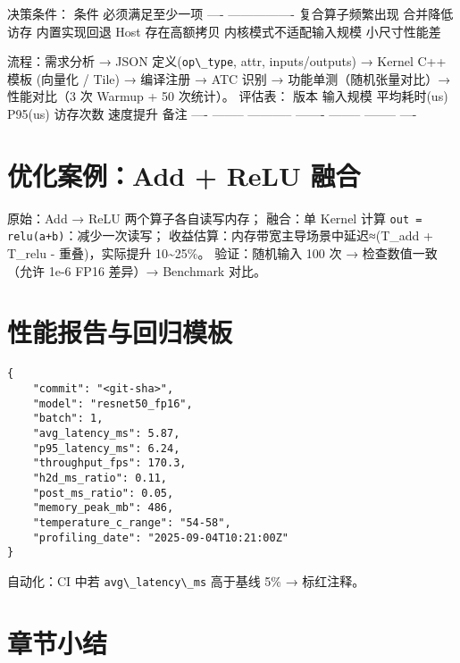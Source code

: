决策条件： \textbar{} 条件 \textbar{} 必须满足至少一项 \textbar{}
\textbar{} ---- \textbar{} ---------------- \textbar{} \textbar{}
复合算子频繁出现 \textbar{} 合并降低访存 \textbar{} \textbar{}
内置实现回退 Host \textbar{} 存在高额拷贝 \textbar{} \textbar{}
内核模式不适配输入规模 \textbar{} 小尺寸性能差 \textbar{}

流程：需求分析 → JSON 定义(\passthrough{\lstinline!op\_type!}, attr,
inputs/outputs) → Kernel C++ 模板 (向量化 / Tile) → 编译注册 → ATC 识别
→ 功能单测（随机张量对比）→ 性能对比（3 次 Warmup + 50 次统计）。
评估表： \textbar{} 版本 \textbar{} 输入规模 \textbar{} 平均耗时(us)
\textbar{} P95(us) \textbar{} 访存次数 \textbar{} 速度提升 \textbar{}
备注 \textbar{} \textbar{} ---- \textbar{} -------- \textbar{}
----------- \textbar{} ------- \textbar{} -------- \textbar{} --------
\textbar{} ---- \textbar{}

\section{优化案例：Add + ReLU
融合}\label{ux4f18ux5316ux6848ux4f8badd-relu-ux878dux5408}

原始：Add → ReLU 两个算子各自读写内存； 融合：单 Kernel 计算
\passthrough{\lstinline!out = relu(a+b)!}：减少一次读写；
收益估算：内存带宽主导场景中延迟≈(T\_add + T\_relu - 重叠)，实际提升
10\textasciitilde25\%。 验证：随机输入 100 次 → 检查数值一致（允许 1e-6
FP16 差异）→ Benchmark 对比。

\section{性能报告与回归模板}\label{ux6027ux80fdux62a5ux544aux4e0eux56deux5f52ux6a21ux677f}

\begin{lstlisting}
{
    "commit": "<git-sha>",
    "model": "resnet50_fp16",
    "batch": 1,
    "avg_latency_ms": 5.87,
    "p95_latency_ms": 6.24,
    "throughput_fps": 170.3,
    "h2d_ms_ratio": 0.11,
    "post_ms_ratio": 0.05,
    "memory_peak_mb": 486,
    "temperature_c_range": "54-58",
    "profiling_date": "2025-09-04T10:21:00Z"
}
\end{lstlisting}

自动化：CI 中若 \passthrough{\lstinline!avg\_latency\_ms!} 高于基线 5\%
→ 标红注释。

\section{章节小结}\label{ux7ae0ux8282ux5c0fux7ed3}

